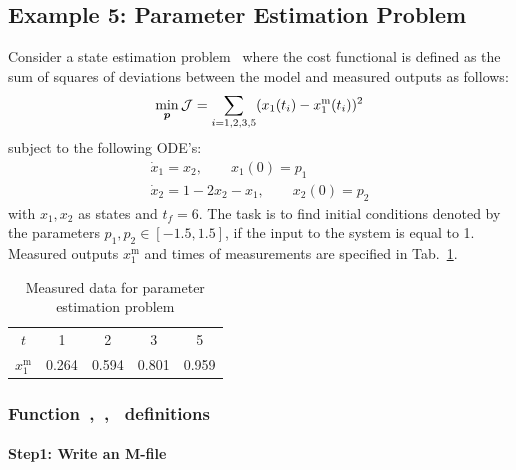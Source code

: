 \subsection{Example 5: Parameter Estimation Problem}
\label{sec:pep}

Consider a state estimation problem~\cite{fik02} where the cost
functional is defined as the sum of squares of deviations between the
model and measured outputs as follows:
\begin{equation}
\min_{\ve{p}} \mf{J} =
\sum_{i=1,2,3,5}(x_{1}(t_{i})-x_{1}^{\text{m}}(t_{i}))^{2}
\label{eq:pep}  
\end{equation}
subject to the following ODE's:
\begin{gather}
\dot{x}_{1} = x_{2}, \qquad x_{1}(0) = p_{1} \\
\dot{x}_{2} = 1 - 2x_{2} - x_{1}, \qquad x_{2}(0) = p_{2}
\end{gather} with $x_{1}, x_{2}$ as states and $t_f = 6$.
The task is to find initial conditions denoted by the parameters
$p_{1}, p_{2} \in [-1.5,1.5]$, if the input to the system is equal to
1. Measured outputs $x_{1}^{\text{m}}$ and times of measurements are
specified in Tab.~\ref{tab:measureddatas}.  

\begin{table}[h]
  \begin{center}
    \begin{tabular}{|c|c|c|c|c|}
      \hline
      $t$ & 1 & 2 & 3 & 5\\
      $x_{1}^{\text{m}}$ & 0.264 & 0.594 & 0.801 & 0.959\\
      \hline
    \end{tabular}
  \end{center}
  \caption{Measured data for parameter estimation problem}
  \label{tab:measureddatas} 
\end{table}
 
\subsubsection{Function~,~,~  definitions}
\label{sec:statepathconprob-fundef}

\paragraph{Step1: Write an M-file }

{\small }

